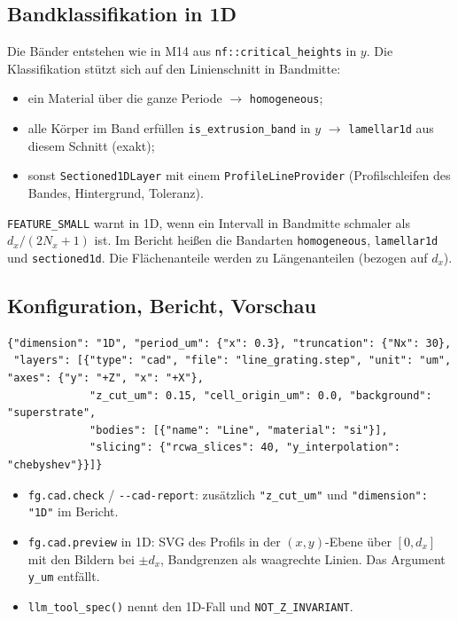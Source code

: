\subsection{Bandklassifikation in 1D}
Die Bänder entstehen wie in M14 aus \verb|nf::critical_heights| in $y$. Die Klassifikation stützt sich auf den
Linienschnitt in Bandmitte:
\begin{itemize}[nosep]
  \item ein Material über die ganze Periode $\to$ \verb|homogeneous|;
  \item alle Körper im Band erfüllen \verb|is_extrusion_band| in $y$ $\to$ \verb|lamellar1d| aus diesem Schnitt (exakt);
  \item sonst \verb|Sectioned1DLayer| mit einem \verb|ProfileLineProvider| (Profilschleifen des Bandes,
        Hintergrund, Toleranz).
\end{itemize}
\verb|FEATURE_SMALL| warnt in 1D, wenn ein Intervall in Bandmitte schmaler als $d_x/(2N_x+1)$ ist. Im Bericht heißen die
Bandarten \verb|homogeneous|, \verb|lamellar1d| und \verb|sectioned1d|. Die Flächenanteile werden zu Längenanteilen
(bezogen auf $d_x$).

\subsection{Konfiguration, Bericht, Vorschau}
{\footnotesize\begin{verbatim}
{"dimension": "1D", "period_um": {"x": 0.3}, "truncation": {"Nx": 30},
 "layers": [{"type": "cad", "file": "line_grating.step", "unit": "um", "axes": {"y": "+Z", "x": "+X"},
             "z_cut_um": 0.15, "cell_origin_um": 0.0, "background": "superstrate",
             "bodies": [{"name": "Line", "material": "si"}],
             "slicing": {"rcwa_slices": 40, "y_interpolation": "chebyshev"}}]}
\end{verbatim}}
\begin{itemize}[nosep]
  \item \verb|fg.cad.check| / \verb|--cad-report|: zusätzlich \verb|"z_cut_um"| und \verb|"dimension": "1D"| im Bericht.
  \item \verb|fg.cad.preview| in 1D: SVG des Profils in der $(x,y)$-Ebene über $[0,d_x]$ mit den Bildern bei $\pm d_x$,
        Bandgrenzen als waagrechte Linien. Das Argument \verb|y_um| entfällt.
  \item \verb|llm_tool_spec()| nennt den 1D-Fall und \verb|NOT_Z_INVARIANT|.
\end{itemize}

